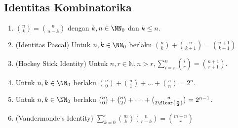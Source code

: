 \subsection{Identitas Kombinatorika}
\begin{enumerate}
    \item  ${n \choose k} = {n \choose n-k}$ dengan $k,n \in \NN_0$ dan $k \le n$.
    \item (Identitas Pascal) Untuk $n,k \in \NN_0$ berlaku ${n \choose k} + {n \choose k+1} = {n+1 \choose k+1}$
    \item (Hockey Stick Identity) Untuk $n,r\in\mathbb{N}, n>r,\sum^n_{i=r}{i\choose r}={n+1\choose r+1}$.
    \item Untuk $n,k \in \NN_0$ berlaku ${n \choose 0}+{n \choose 1} + \dots + {n \choose n} = 2^{n}$.
    \item Untuk $n,k \in \NN_0$ berlaku ${n \choose 0}+{n \choose 2} + \dots + {n \choose 2\floor{\frac{n}{2}}} = 2^{n-1}$.
    \item (Vandermonde's Identity)  $\sum_{k=0}^r\binom mk\binom n{r-k}=\binom{m+n}r$
\end{enumerate}